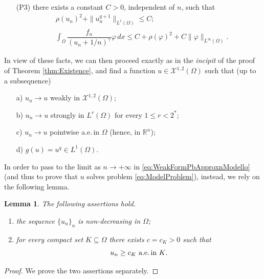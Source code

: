 \documentclass[11pt,a4paper]{amsart}
\def \R {\mathbb{R}}
\theoremstyle{definition}
\theoremstyle{plain}
\newtheorem{lemma}[definition]{Lemma}
\numberwithin{equation}{section}
\begin{document}
{\begin{itemize}
\begin{equation*}
\begin{cases}
			u \geq 0 & \textrm{in } \Omega,\\
			u = 0 & \textrm{in } \mathbb{R}^{n}\setminus \Omega,
		\end{cases}
	\end{equation*}  
	that is, $u_n\geq 0$ a.e.\,in $\Omega$ and
	\begin{equation} \label{eq:WeakFormPbApproxnModello}
		\mathcal{B}(u_n,\varphi)+\int_\Omega u_n^q\varphi\,dx =\int_\Omega \dfrac{f_n}{(u_n+1/n)^\gamma}\varphi\,dx\quad 
		\text{for every $\varphi\in \mathcal{X}^{1,2}(\Omega)$}.
	\end{equation}
	\item[(P3)] there exists a constant $C>0$, independent of $n$, such that
	\begin{align}
		&\rho(u_n)^2 + \|u_n^{q+1}\|_{L^{1}(\Omega)} \leq C;  \label{eq:Apriori_estimatesModello} \\
		&\int_{\Omega}\dfrac{f_n}{(u_n+1/n)^\gamma}\varphi\,dx
		\leq C + \rho(\varphi)^2 + C\|\varphi\|_{L^{\infty}(\Omega)}.
		\label{eq:Apriori_estimates_2Modello}
	\end{align}
\end{itemize}
In view of these facts, we can then proceed exactly as in the \emph{incipit} of the proof of Theorem
\ref{thm:Existence}, and find a function 
$u\in\mathcal{X}^{1,2}(\Omega)$ such that (up to a subsequence)
\begin{itemize}
	\item[a)] $u_n \to u$ weakly in $\mathcal{X}^{1,2}(\Omega)$;
	\item[b)] $u_n \to u$  strongly in $L^{r}(\Omega)$ for every $1\leq r<2^{\ast}$;
	\item[c)] $u_n\to u$ pointwise a.e.\,in $\Omega$ (hence, in $\R^n$);
	\item[d)] $g(u) = u^q\in L^1(\Omega)$.
\end{itemize} 
In order to pass to the limit as $n\to+\infty$ in 
\eqref{eq:WeakFormPbApproxnModello} (and thus to prove
that $u$ solves problem \eqref{eq:ModelProblem}), instead, we rely on the following lemma.
\begin{lemma} \label{lem:propunModelCase}
	The following assertions hold.
	\begin{enumerate}
		\item the sequence $\{u_n\}_n$ is non-decreasing in $\Omega$;
		\item for every compact set $K\subseteq\Omega$ there exists $c = c_K > 0$ such that
		\begin{equation} \label{eq:staccadazero}
			\text{$u_n\geq c_K$ a.e.\,in $K$}.
		\end{equation}
	\end{enumerate}
\end{lemma}
\begin{proof}
	We prove the two assertions separately.
	\medskip
	

\end{proof}}
\end{document}
